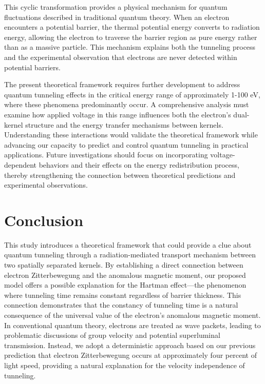 \documentclass[%
 reprint,
 amsmath,amssymb,
 aps,
]{revtex4-1}
\numberwithin{equation}{section}%
\begin{document}
This cyclic transformation provides a physical mechanism for quantum fluctuations described in traditional quantum theory. When an electron encounters a potential barrier, the thermal potential energy converts to radiation energy, allowing the electron to traverse the barrier region as pure energy rather than as a massive particle. This mechanism explains both the tunneling process and the experimental observation that electrons are never detected within potential barriers.

The present theoretical framework requires further development to address quantum tunneling effects in the critical energy range of approximately 1-100 eV, where these phenomena predominantly occur. A comprehensive analysis must examine how applied voltage in this range influences both the electron's dual-kernel structure and the energy transfer mechanisms between kernels. Understanding these interactions would validate the theoretical framework while advancing our capacity to predict and control quantum tunneling in practical applications. Future investigations should focus on incorporating voltage-dependent behaviors and their effects on the energy redistribution process, thereby strengthening the connection between theoretical predictions and experimental observations.


\section{Conclusion}
\label{sec:Conclusion}

This study introduces a theoretical framework that could provide a clue about quantum tunneling through a radiation-mediated transport mechanism between two spatially separated kernels. By establishing a direct connection between electron Zitterbewegung and the anomalous magnetic moment, our proposed model offers a possible explanation for the Hartman effect---the phenomenon where tunneling time remains constant regardless of barrier thickness. This connection demonstrates that the constancy of tunneling time is a natural consequence of the universal value of the electron's anomalous magnetic moment. In conventional quantum theory, electrons are treated as wave packets, leading to problematic discussions of group velocity and potential superluminal transmission. Instead, we adopt a deterministic approach based on our previous prediction that electron Zitterbewegung occurs at approximately four percent of light speed, providing a natural explanation for the velocity independence of tunneling.
\end{document}
